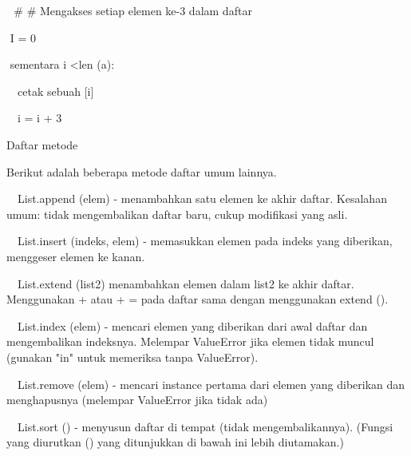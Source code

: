 \documentclass[a4paper,12pt]{report}
\begin{document}
\vspace{12pt}
\noindent 
 $  $ $  $ $  \#  $ $  \#  $ Mengakses setiap elemen ke-3 dalam daftar \par
\noindent 
 $  $ $  $I = 0 \par
\noindent 
 $  $ $  $sementara i <len (a): \par
\noindent 
 $  $ $  $ $  $ $  $cetak sebuah [i] \par
\noindent 
 $  $ $  $ $  $ $  $i = i + 3 \par
\noindent 
{\fontsize{14pt}{14pt}\selectfont Daftar metode \\} \par
\vspace{14pt}
\noindent 
{\fontsize{14pt}{14pt}\selectfont Berikut adalah beberapa metode daftar umum lainnya. \\} \par
\vspace{14pt}
\noindent 
{\fontsize{14pt}{14pt}\selectfont  $  $ $  $ $  $ $  $List.append (elem) - menambahkan satu elemen ke akhir daftar. Kesalahan umum: tidak mengembalikan daftar baru, cukup modifikasi yang asli. \\} \par
\noindent 
{\fontsize{14pt}{14pt}\selectfont  $  $ $  $ $  $ $  $List.insert (indeks, elem) - memasukkan elemen pada indeks yang diberikan, menggeser elemen ke kanan. \\} \par
\noindent 
{\fontsize{14pt}{14pt}\selectfont  $  $ $  $ $  $ $  $List.extend (list2) menambahkan elemen dalam list2 ke akhir daftar. Menggunakan + atau + = pada daftar sama dengan menggunakan extend (). \\} \par
\noindent 
{\fontsize{14pt}{14pt}\selectfont  $  $ $  $ $  $ $  $List.index (elem) - mencari elemen yang diberikan dari awal daftar dan mengembalikan indeksnya. Melempar ValueError jika elemen tidak muncul (gunakan "in" untuk memeriksa tanpa ValueError). \\} \par
\noindent 
{\fontsize{14pt}{14pt}\selectfont  $  $ $  $ $  $ $  $List.remove (elem) - mencari instance pertama dari elemen yang diberikan dan menghapusnya (melempar ValueError jika tidak ada) \\} \par
\noindent 
{\fontsize{14pt}{14pt}\selectfont  $  $ $  $ $  $ $  $List.sort () - menyusun daftar di tempat (tidak mengembalikannya). (Fungsi yang diurutkan () yang ditunjukkan di bawah ini lebih diutamakan.) \\} \par
\end{document}
